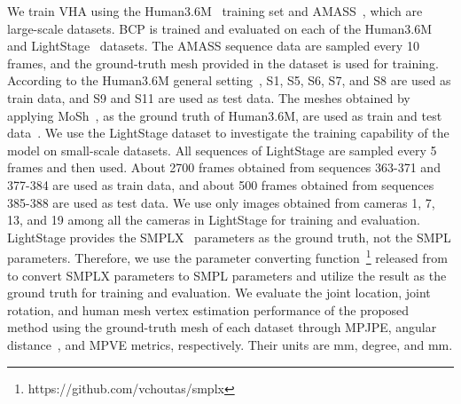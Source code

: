 \documentclass{article}
\begin{document}
We train VHA using the Human3.6M~\cite{2014_H36M} training set and AMASS~\cite{moshpp_AMASS_2019}, which are large-scale datasets. BCP is trained and evaluated on each of the Human3.6M and LightStage~\cite{peng2021neural} datasets. The AMASS sequence data are sampled every 10 frames, and the ground-truth mesh provided in the dataset is used for training. According to the Human3.6M general setting~\cite{2018_Kanazawa, 2019_LT, Chun_2023_WACV, 2020_Shin, choi2022learning}, S1, S5, S6, S7, and S8 are used as train data, and S9 and S11 are used as test data. The meshes obtained by applying MoSh~\cite{mosh_Loper_2014}, as the ground truth of Human3.6M, are used as train and test data~\cite{Chun_2023_WACV}. We use the LightStage dataset to investigate the training capability of the model on small-scale datasets. All sequences of LightStage are sampled every 5 frames and then used. About 2700 frames obtained from sequences 363-371 and 377-384 are used as train data, and about 500 frames obtained from sequences 385-388 are used as test data. We use only images obtained from cameras 1, 7, 13, and 19 among all the cameras in LightStage for training and evaluation. LightStage provides the SMPLX~\cite{SMPLify_X_2019_Pavlakos} parameters as the ground truth, not the SMPL parameters. Therefore, we use the parameter converting function~\footnote{https://github.com/vchoutas/smplx} released from~\cite{SMPLify_X_2019_Pavlakos} to convert SMPLX parameters to SMPL parameters and utilize the result as the ground truth for training and evaluation. We evaluate the joint location, joint rotation, and human mesh vertex estimation performance of the proposed method using the ground-truth mesh of each dataset through MPJPE, angular distance~\cite{Hartley_IJCV2013}, and MPVE metrics, respectively. Their units are mm, degree, and mm.
\end{document}

